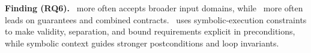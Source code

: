 \let\strengthbar\relax

\begin{finding}
{\textbf{Finding (RQ6).} \autospec\ more often accepts broader input domains, while \toolname\ more often leads on guarantees and combined contracts. \toolname\ uses symbolic-execution constraints to make validity, separation, and bound requirements explicit in preconditions, while symbolic context guides stronger postconditions and loop invariants.}
\end{finding}
